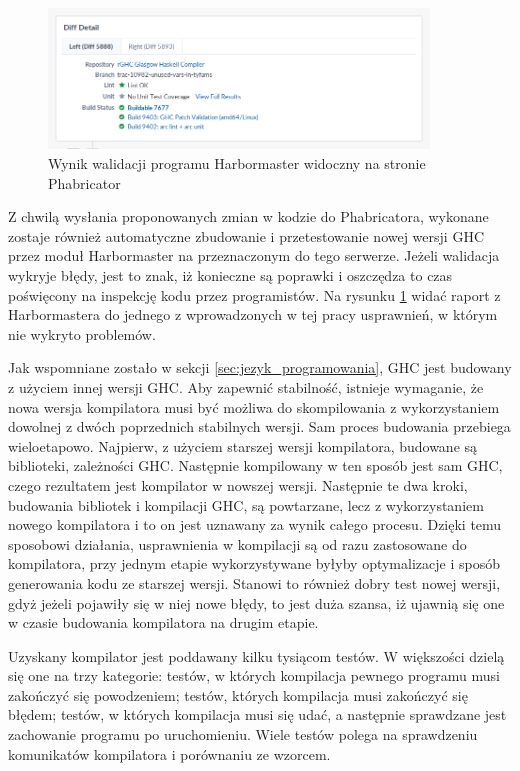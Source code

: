 \begin{figure}[ht]
    \centering
    \includegraphics[width=0.9\textwidth]{images/Phabricator_validate}
    \caption{Wynik walidacji programu Harbormaster widoczny na stronie Phabricator}
    \label{fig:Phabricator_validate}
\end{figure}

Z chwilą wysłania proponowanych zmian w kodzie do Phabricatora, wykonane zostaje
również automatyczne zbudowanie i przetestowanie nowej wersji GHC przez moduł
Harbormaster na przeznaczonym do tego serwerze. Jeżeli walidacja wykryje błędy,
jest to znak, iż konieczne są poprawki i oszczędza to czas poświęcony na
inspekcję kodu przez programistów. Na rysunku \ref{fig:Phabricator_validate}
widać raport z Harbormastera do jednego z wprowadzonych w tej pracy usprawnień,
w którym nie wykryto problemów.

Jak wspomniane zostało w sekcji \ref{sec:jezyk_programowania}, GHC jest budowany
z użyciem innej wersji GHC. Aby zapewnić stabilność, istnieje wymaganie, że nowa
wersja kompilatora musi być możliwa do skompilowania z wykorzystaniem dowolnej z
dwóch poprzednich stabilnych wersji\cite{WikiFixingBugs}. Sam proces budowania
przebiega wieloetapowo. Najpierw, z użyciem starszej wersji kompilatora,
budowane są biblioteki, zależności GHC. Następnie kompilowany w ten sposób jest
sam GHC, czego rezultatem jest kompilator w nowszej wersji. Następnie te dwa
kroki, budowania bibliotek i kompilacji GHC, są powtarzane, lecz z
wykorzystaniem nowego kompilatora i to on jest uznawany za wynik całego
procesu\cite{WikiBuildSystem}. Dzięki temu sposobowi działania, usprawnienia w
kompilacji są od razu zastosowane do kompilatora, przy jednym etapie
wykorzystywane byłyby optymalizacje i sposób generowania kodu ze starszej
wersji. Stanowi to również dobry test nowej wersji, gdyż jeżeli pojawiły się w
niej nowe błędy, to jest duża szansa, iż ujawnią się one w czasie budowania
kompilatora na drugim etapie.

Uzyskany kompilator jest poddawany kilku tysiącom testów. W większości dzielą
się one na trzy kategorie: testów, w których kompilacja pewnego programu musi
zakończyć się powodzeniem; testów, których kompilacja musi zakończyć się błędem;
testów, w których kompilacja musi się udać, a następnie sprawdzane jest
zachowanie programu po uruchomieniu. Wiele testów polega na sprawdzeniu
komunikatów kompilatora i porównaniu ze wzorcem.
